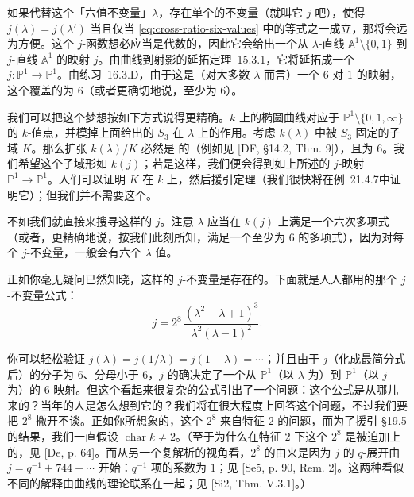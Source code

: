 如果代替这个「六值不变量」$\lambda$，存在单个的不变量（就叫它 $j$ 吧），使得 $j(\lambda)=j(\lambda')$ 当且仅当 \eqref{eq:cross-ratio-six-values} 中的等式之一成立，那将会远为方便。这个 $j$-函数想必应当是代数的，因此它会给出一个从 $\lambda$-直线 $\mathbb{A}^1\setminus\{0,1\}$ 到 $j$-直线 $\mathbb{A}^1$ 的映射 $j$。由\mbox{曲线到射影的延拓定理~15.3.1}，它将延拓成一个\trMorphism{} $j\colon\mathbb{P}^1\to\mathbb{P}^1$。由\mbox{练习~16.3.D}，由于这是（对大多数 $\lambda$ 而言）一个 $6$ 对 $1$ 的映射，这个覆盖的\trDegree{}为 $6$（或者更确切地说，至少为 $6$）。

我们可以把这个梦想按如下方式说得更精确。$k$ 上的椭圆曲线对应于 $\mathbb{P}^1\setminus\{0,1,\infty\}$ 的 $k$-值点，并模掉上面给出的 $S_3$ 在 $\lambda$ 上的作用。考虑 $k(\lambda)$ 中被 $S_3$ 固定的子域 $K$。那么扩张 $k(\lambda)/K$ 必然是 \trGalois{}的（例如见 [DF, \S14.2, Thm. 9]），且\trDegree{}为 $6$。我们希望这个子域形如 $k(j)$；若是这样，我们便会得到如上所述的 $j$-映射 $\mathbb{P}^1\to\mathbb{P}^1$。人们可以证明 $K$ 在 $k$ 上\trFinitelyGenerated，然后援引\trLuroth{}定理（我们很快将在\mbox{例~21.4.7}中证明它）；但我们并不需要这个。

不如我们就直接来搜寻这样的 $j$。注意 $\lambda$ 应当在 $k(j)$ 上满足一个六次多项式（或者，更精确地说，按我们此刻所知，满足一个\trDegree{}至少为 $6$ 的多项式），因为对每个 $j$-不变量，一般会有六个 $\lambda$ 值。

正如你毫无疑问已然知晓，这样的 $j$-不变量是存在的。下面就是人人都用的那个 $j$-不变量公式：
\begin{equation*}\tag{19.9.7.2}\label{eq:j-invariant-formula}
j=2^8\,\frac{(\lambda^2-\lambda+1)^3}{\lambda^2(\lambda-1)^2}.
\end{equation*}

你可以轻松验证 $j(\lambda)=j(1/\lambda)=j(1-\lambda)=\cdots$；并且由于 $j$（化成最简分式后）的分子\trDegree{}为 $6$、分母\trDegree{}小于 $6$，$j$ 的确决定了一个从 $\mathbb{P}^1$（以 $\lambda$ 为\trCoordinate）到 $\mathbb{P}^1$（以 $j$ 为\trCoordinate）的\trDegree{} $6$ 映射。但这个看起来很复杂的公式引出了一个问题：这个公式是从哪儿来的？当年的人是怎么想到它的？我们将在很大程度上回答这个问题，不过我们要把 $2^8$ 撇开不谈。正如你所想象的，这个 $2^8$ 来自特征 $2$ 的问题，而为了援引 \S19.5 的结果，我们一直假设 $\operatorname{char}k\ne 2$。（至于为什么在特征 $2$ 下这个 $2^8$ 是被迫加上的，见 [De, p. 64]。而从另一个复解析的视角看，$2^8$ 的由来是因为 $j$ 的 $q$-展开由 $j=q^{-1}+744+\cdots$ 开始：$q^{-1}$ 项的系数为 $1$；见 [Se5, p. 90, Rem. 2]。这两种看似不同的解释由\trTate{}曲线的理论联系在一起；见 [Si2, Thm. V.3.1]。）

